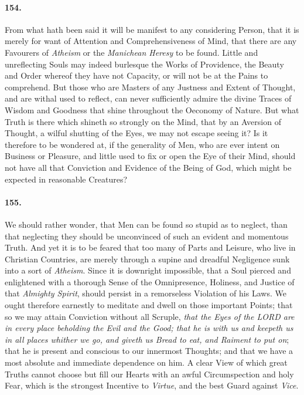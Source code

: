 \documentclass[]{article}
\newenvironment{sectionbody}{}{}
\begin{document}
\begin{sectionbody}
\paragraph{154.} From what hath been said it will be manifest to any considering
Person, that it is merely for want of Attention and
Comprehensiveness of Mind, that there are any Favourers of
\emph{Atheism} or the \emph{Manichean Heresy} to be found.
Little and unreflecting Souls may indeed burlesque the Works of
Providence, the Beauty and Order whereof they have not Capacity,
or will not be at the Pains to comprehend.  But those who are
Masters of any Justness and Extent of Thought, and are withal
used to reflect, can never sufficiently admire the divine Traces
of Wisdom and Goodness that shine throughout the Oeconomy of
Nature.  But what Truth is there which shineth so strongly on the
Mind, that by an Aversion of Thought, a wilful shutting of the
Eyes, we may not escape seeing it?  Is it therefore to be
wondered at, if the generality of Men, who are ever intent on
Business or Pleasure, and little used to fix or open the Eye of
their Mind, should not have all that Conviction and Evidence of
the Being of {\sc God}, which might be expected in reasonable
Creatures?



\paragraph{155.} We should rather wonder, that Men can be found so stupid as to
neglect, than that neglecting they should be unconvinced of such
an evident and momentous Truth.  And yet it is to be feared that
too many of Parts and Leisure, who live in Christian Countries,
are merely through a supine and dreadful Negligence sunk into a
sort of \emph{Atheism}.  Since it is downright impossible, that a
Soul pierced and enlightened with a thorough Sense of the
Omnipresence, Holiness, and Justice of that \emph{Almighty
Spirit}, should persist in a remorseless Violation of his Laws.
We ought therefore earnestly to meditate and dwell on those
important Points; that so we may attain Conviction without all
Scruple, \emph{that the Eyes of the LORD are in every place
beholding the Evil and the Good; that he is with us and keepeth
us in all places whither we go, and giveth us Bread to eat, and
Raiment to put on}; that he is present and conscious to our
innermost Thoughts; and that we have a most absolute and
immediate dependence on him.  A clear View of which great Truths
cannot choose but fill our Hearts with an awful Circumspection
and holy Fear, which is the strongest Incentive to \emph{Virtue},
and the best Guard against \emph{Vice}.




\end{sectionbody}
\end{document}
